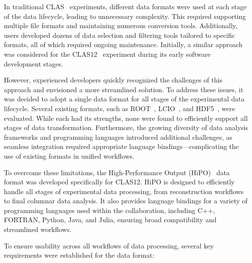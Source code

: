 In traditional CLAS~\cite{CLAS:2003umf} experiments, different data formats were used at each stage of the data lifecycle, leading to unnecessary complexity. This required supporting multiple file formats and maintaining numerous conversion tools. Additionally, users developed dozens of data selection and filtering tools tailored to specific formats, all of which required ongoing maintenance. Initially, a similar approach was considered for the CLAS12~\cite{Burkert:2020akg} experiment during its early software development stages.

However, experienced developers quickly recognized the challenges of this approach and envisioned a more streamlined solution. To address these issues, it was decided to adopt a single data format for all stages of the experimental data lifecycle. Several existing formats, such as ROOT~\cite{Brun:1997pa}, LCIO~\cite{Aplin:2012kj}, and HDF5~\cite{HDF5:2000pa}, were evaluated. While each had its strengths, none were found to efficiently support all stages of data transformation. Furthermore, the growing diversity of data analysis frameworks and programming languages introduced additional challenges, as seamless integration required appropriate language bindings—complicating the use of existing formats in unified workflows.

To overcome these limitations, the High-Performance Output (HiPO)~\cite{hipo5p0:2025jk} data format was developed specifically for CLAS12. HiPO is designed to efficiently handle all stages of experimental data processing, from reconstruction workflows to final columnar data analysis. It also provides language bindings for a variety of programming languages used within the collaboration, including C++, FORTRAN, Python, Java, and Julia, ensuring broad compatibility and streamlined workflows.


To ensure usability across all workflows of data processing, several key requirements were established for the data format:


